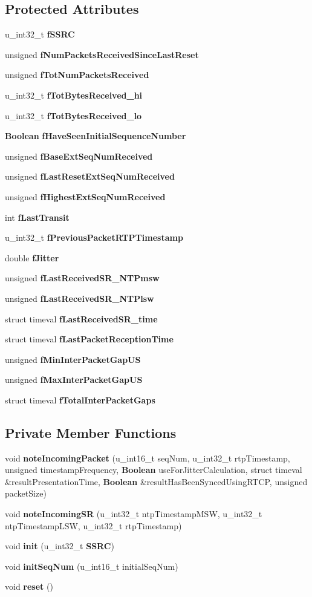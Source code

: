 \subsection*{Protected Attributes}
\begin{DoxyCompactItemize}
\item 
u\+\_\+int32\+\_\+t {\bf f\+S\+S\+R\+C}
\item 
unsigned {\bf f\+Num\+Packets\+Received\+Since\+Last\+Reset}
\item 
unsigned {\bf f\+Tot\+Num\+Packets\+Received}
\item 
u\+\_\+int32\+\_\+t {\bf f\+Tot\+Bytes\+Received\+\_\+hi}
\item 
u\+\_\+int32\+\_\+t {\bf f\+Tot\+Bytes\+Received\+\_\+lo}
\item 
{\bf Boolean} {\bf f\+Have\+Seen\+Initial\+Sequence\+Number}
\item 
unsigned {\bf f\+Base\+Ext\+Seq\+Num\+Received}
\item 
unsigned {\bf f\+Last\+Reset\+Ext\+Seq\+Num\+Received}
\item 
unsigned {\bf f\+Highest\+Ext\+Seq\+Num\+Received}
\item 
int {\bf f\+Last\+Transit}
\item 
u\+\_\+int32\+\_\+t {\bf f\+Previous\+Packet\+R\+T\+P\+Timestamp}
\item 
double {\bf f\+Jitter}
\item 
unsigned {\bf f\+Last\+Received\+S\+R\+\_\+\+N\+T\+Pmsw}
\item 
unsigned {\bf f\+Last\+Received\+S\+R\+\_\+\+N\+T\+Plsw}
\item 
struct timeval {\bf f\+Last\+Received\+S\+R\+\_\+time}
\item 
struct timeval {\bf f\+Last\+Packet\+Reception\+Time}
\item 
unsigned {\bf f\+Min\+Inter\+Packet\+Gap\+U\+S}
\item 
unsigned {\bf f\+Max\+Inter\+Packet\+Gap\+U\+S}
\item 
struct timeval {\bf f\+Total\+Inter\+Packet\+Gaps}
\end{DoxyCompactItemize}
\subsection*{Private Member Functions}
\begin{DoxyCompactItemize}
\item 
void {\bf note\+Incoming\+Packet} (u\+\_\+int16\+\_\+t seq\+Num, u\+\_\+int32\+\_\+t rtp\+Timestamp, unsigned timestamp\+Frequency, {\bf Boolean} use\+For\+Jitter\+Calculation, struct timeval \&result\+Presentation\+Time, {\bf Boolean} \&result\+Has\+Been\+Synced\+Using\+R\+T\+C\+P, unsigned packet\+Size)
\item 
void {\bf note\+Incoming\+S\+R} (u\+\_\+int32\+\_\+t ntp\+Timestamp\+M\+S\+W, u\+\_\+int32\+\_\+t ntp\+Timestamp\+L\+S\+W, u\+\_\+int32\+\_\+t rtp\+Timestamp)
\item 
void {\bf init} (u\+\_\+int32\+\_\+t {\bf S\+S\+R\+C})
\item 
void {\bf init\+Seq\+Num} (u\+\_\+int16\+\_\+t initial\+Seq\+Num)
\item 
void {\bf reset} ()
\end{DoxyCompactItemize}
